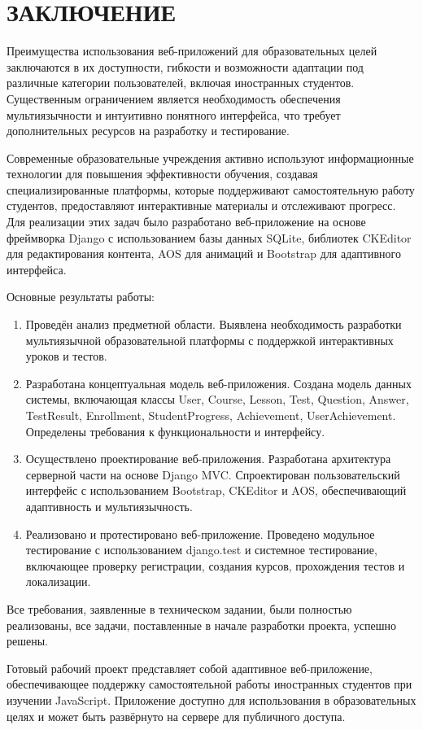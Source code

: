 \section*{ЗАКЛЮЧЕНИЕ}

Преимущества использования веб-приложений для образовательных целей заключаются в их доступности, гибкости и возможности адаптации под различные категории пользователей, включая иностранных студентов. Существенным ограничением является необходимость обеспечения мультиязычности и интуитивно понятного интерфейса, что требует дополнительных ресурсов на разработку и тестирование.

Современные образовательные учреждения активно используют информационные технологии для повышения эффективности обучения, создавая специализированные платформы, которые поддерживают самостоятельную работу студентов, предоставляют интерактивные материалы и отслеживают прогресс. Для реализации этих задач было разработано веб-приложение на основе фреймворка Django с использованием базы данных SQLite, библиотек CKEditor для редактирования контента, AOS для анимаций и Bootstrap для адаптивного интерфейса.

Основные результаты работы:

\begin{enumerate}
	\item Проведён анализ предметной области. Выявлена необходимость разработки мультиязычной образовательной платформы с поддержкой интерактивных уроков и тестов.
	\item Разработана концептуальная модель веб-приложения. Создана модель данных системы, включающая классы User, Course, Lesson, Test, Question, Answer, TestResult, Enrollment, StudentProgress, Achievement, UserAchievement. Определены требования к функциональности и интерфейсу.
	\item Осуществлено проектирование веб-приложения. Разработана архитектура серверной части на основе Django MVC. Спроектирован пользовательский интерфейс с использованием Bootstrap, CKEditor и AOS, обеспечивающий адаптивность и мультиязычность.
	\item Реализовано и протестировано веб-приложение. Проведено модульное тестирование с использованием django.test и системное тестирование, включающее проверку регистрации, создания курсов, прохождения тестов и локализации.
\end{enumerate}

Все требования, заявленные в техническом задании, были полностью реализованы, все задачи, поставленные в начале разработки проекта, успешно решены.

Готовый рабочий проект представляет собой адаптивное веб-приложение, обеспечивающее поддержку самостоятельной работы иностранных студентов при изучении JavaScript. Приложение доступно для использования в образовательных целях и может быть развёрнуто на сервере для публичного доступа.